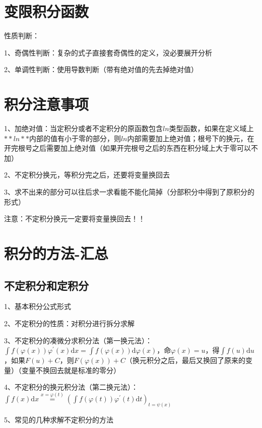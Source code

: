 \section{变限积分函数}

性质判断：

1、奇偶性判断：复杂的式子直接套奇偶性的定义，没必要展开分析

2、单调性判断：使用导数判断（带有绝对值的先去掉绝对值）

\section{积分注意事项}

1、加绝对值：当定积分或者不定积分的原函数包含$ ln $类型函数，如果在定义域上$ **ln** $内部的值有小于零的部分，则$ ln $内部需要加上绝对值；根号下的换元，在开完根号之后需要加上绝对值（如果开完根号之后的东西在积分域上大于零可以不加）

2、不定积分换元，等积分完之后，还要将变量换回去

3、求不出来的部分可以往后求一求看能不能化简掉（分部积分中得到了原积分的形式）

注意：不定积分换元一定要将变量换回去！！

\section{积分的方法-汇总}



\subsection{不定积分和定积分}

1、基本积分公式形式

2、不定积分的性质：对积分进行拆分求解

3、不定积分的凑微分求积分法（第一换元法）：$ \int f(\varphi(x)) \varphi^{\prime}(x) \mathrm{d} x =\int f(\varphi(x)) \mathrm{d} \varphi(x)  $，命$ \varphi(x)=u $，得$ \int f(u) \mathrm{d} u  $，如果$ F(u)+C  $，则$ F(\varphi(x))+C $（换元积分之后，最后又换回了原来的变量）（变量不换回去就是标准的零分）

4、不定积分的换元积分法（第二换元法）：$ \int f(x) \mathrm{d} x \stackrel{x=\varphi(t)}{=}\left(\int f(\varphi(t)) \varphi^{\prime}(t) \mathrm{d} t\right)_{t=\psi(x)} $

5、常见的几种求解不定积分的方法

